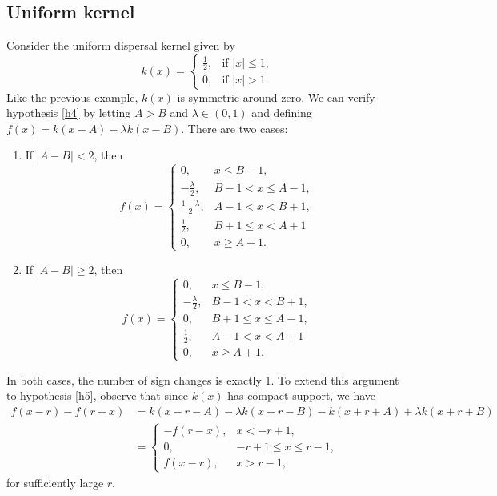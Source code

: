 \documentclass[11pt]{article}
\theoremstyle{definition}
\numberwithin{equation}{section}
\numberwithin{thm}{section}
\begin{document}
\subsection{Uniform kernel}

Consider the uniform dispersal kernel given by
\begin{equation}
k(x) = \begin{cases}
\frac{1}{2}, & \text{if } |x|\leq 1, \\
0, & \text{if } |x| > 1.
\end{cases} \end{equation}
Like the previous example, $k(x)$ is symmetric around zero. We can verify hypothesis \ref{h4} by letting $A>B$ and $\lambda \in (0,1)$ and defining $f(x)=k(x-A)-\lambda k(x-B)$. There are two cases:
\begin{enumerate}[{Case} 1.]
\item If $|A-B|<2$, then
$$
f(x) = \begin{cases}
0, & x \leq B-1, \\
-\frac{\lambda}{2}, & B-1 < x \leq A-1, \\
\frac{1-\lambda}{2}, & A-1 < x < B+1, \\
\frac{1}{2}, & B+1 \leq x < A+1 \\
0, & x \geq A+1.
\end{cases}
$$

\item If $|A-B| \geq 2$, then
$$
f(x) = \begin{cases}
0, & x \leq B-1, \\
-\frac{\lambda}{2}, & B-1 < x < B+1, \\
0, & B+1 \leq x \leq  A-1, \\
\frac{1}{2}, & A-1 < x < A+1 \\
0, & x \geq A+1.
\end{cases}
$$
\end{enumerate}
In both cases, the number of sign changes is exactly 1. To extend this argument to hypothesis \ref{h5}, observe that since $k(x)$ has compact support, we have
$$
\begin{aligned}
f(x-r) - f(r-x) &= k(x-r-A) - \lambda k(x-r-B) - k(x+r+A) + \lambda k(x+r+B) \\
&=  \begin{cases}
-f(r-x), & x < -r+1, \\
0, & -r+1 \leq x \leq r-1, \\
f(x-r), & x > r-1,
\end{cases}
\end{aligned}
$$
for sufficiently large $r$. 
\end{document}
